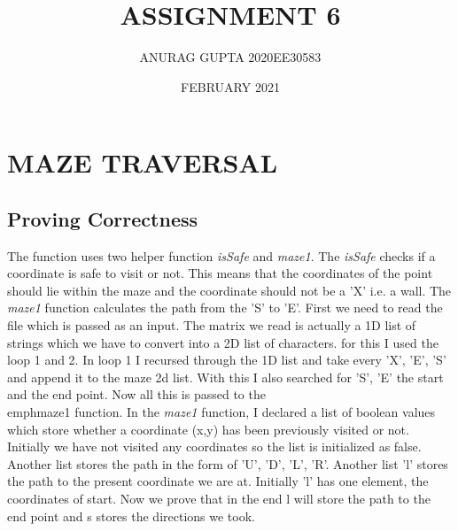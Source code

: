 \documentclass{article}
\title{ASSIGNMENT 6}
\author{ANURAG GUPTA  2020EE30583}
\date{FEBRUARY 2021}
\begin{document}
\maketitle

\section{MAZE TRAVERSAL}
\subsection{Proving Correctness}
The function uses two helper function \emph{isSafe} and \emph{maze1}. The \emph{isSafe} checks if a coordinate is safe to visit or not. This means that the coordinates of the point should lie within the maze and the coordinate should not be a 'X' i.e. a wall. The \emph{maze1} function calculates the path from the 'S' to 'E'. First we need to read the file which is passed as an input. The matrix we read is actually a 1D list of strings which we have to convert into a 2D list of characters. for this I used the loop 1 and 2. In loop 1 I recursed through the 1D list and take every 'X', 'E', 'S' and append it to the maze 2d list. With this I also searched for 'S', 'E' the start and the end point. Now all this is passed to the \\emph{maze1} function. In the \emph{maze1} function, I declared a list of boolean values which store whether a coordinate (x,y) has been previously visited or not. Initially we have not visited any coordinates so the list is initialized as false. Another list stores the path in the form of 'U', 'D', 'L', 'R'. Another list 'l' stores the path to the present coordinate we are at. Initially 'l' has one element, the coordinates of start. Now we prove that in the end l will store the path to the end point and s stores the directions we took.\\
\end{document}
